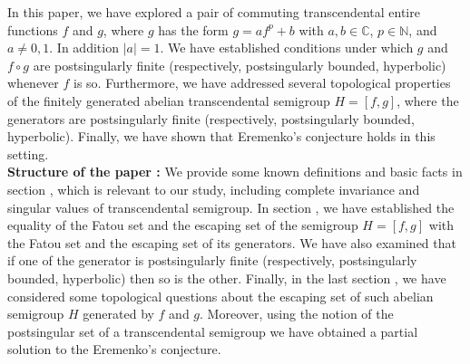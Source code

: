 \documentclass[a4paper,12pt]{amsart}
\newcommand{\C}{\mathbb{C}}
\newcommand{\N}{\mathbb{N}}
\numberwithin{equation}{section}
\begin{document}
	In this paper, we have explored a pair of commuting transcendental entire functions $f$ and $g$, where $g$ has the form $g = af^p + b$ with $a, b \in \C$, $p \in \N$, and $a \neq 0,1$. In addition $|a|=1$. We have established conditions under which $g$ and $f \circ g$ are postsingularly finite (respectively, postsingularly bounded, hyperbolic) whenever $f$ is so. Furthermore, we have  addressed several topological properties of the finitely generated abelian transcendental semigroup $H=[f,g]$, where the generators are postsingularly finite (respectively, postsingularly bounded, hyperbolic). Finally, we have shown that Eremenko’s conjecture holds in this setting.\\
		\textbf{Structure of the paper :} We provide some known definitions and basic facts in section , which is relevant to our study, including complete invariance and singular values of transcendental semigroup. In section , we have established the equality of the Fatou set and the escaping set of the semigroup $H=[f,g]$ with the Fatou set and the escaping set of its generators. We have also examined that if one of the generator is postsingularly finite (respectively, postsingularly bounded, hyperbolic) then so is the other. Finally, in the last section , we have considered some topological questions about the escaping set of such abelian semigroup $H$ generated by $f$ and $g$. Moreover, using the notion of the postsingular set of a transcendental semigroup we have obtained a partial solution to the Eremenko's conjecture. 
\end{document}
